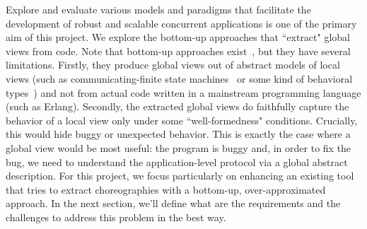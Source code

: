 Explore and evaluate various models and paradigms that facilitate the development of robust and scalable concurrent applications is one of the primary aim of this project. We explore the bottom-up approaches that ``extract" global views from code. Note that bottom-up approaches
exist~\cite{myh09,lt12,LangeTY15,cflm17,cms18}, but they have several
limitations.
%
Firstly, they produce global views out of abstract models of local views (such as communicating-finite state machines~\cite{bz83} or some kind of behavioral types~\cite{Huttel+16}) and not from actual code written in a mainstream programming language (such as Erlang). Secondly, the extracted global views do faithfully capture the behavior of a local view only under some ``well-formedness" conditions. Crucially, this would hide buggy or unexpected behavior.
%
This is exactly the case where a global view would be most useful: the program is buggy and, in order to fix the bug, we need to understand the application-level protocol via a global abstract
description.
%
For this project, we focus particularly on enhancing an existing tool that tries to extract choreographies with a bottom-up, over-approximated approach. In the next section, we'll define what are the requirements and the challenges to address this problem in the best way.
